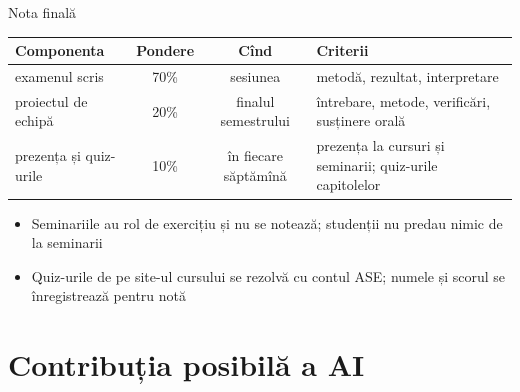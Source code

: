 \begin{frame}{Nota finală}
\itemsize{\small}
\begin{center}
\footnotesize
\begin{tabular}{>{\raggedright\arraybackslash}p{3.2cm}cc>{\raggedright\arraybackslash}p{5.6cm}}
\toprule
\textbf{Componenta} & \textbf{Pondere} & \textbf{Cînd} & \textbf{Criterii} \\
\midrule
examenul scris & 70\% & sesiunea & metodă, rezultat, interpretare \\
proiectul de echipă & 20\% & finalul semestrului & întrebare, metode, verificări, susținere orală \\
prezența și quiz-urile & 10\% & în fiecare săptămînă & prezența la cursuri și seminarii; quiz-urile capitolelor \\
\bottomrule
\end{tabular}
\end{center}
\begin{itemize}
    \item Seminariile au rol de exercițiu și nu se notează; studenții nu predau nimic de la seminarii
    \item Quiz-urile de pe site-ul cursului se rezolvă cu contul ASE; numele și scorul se înregistrează pentru notă
\end{itemize}
\end{frame}


\section{Contribuția posibilă a AI}

